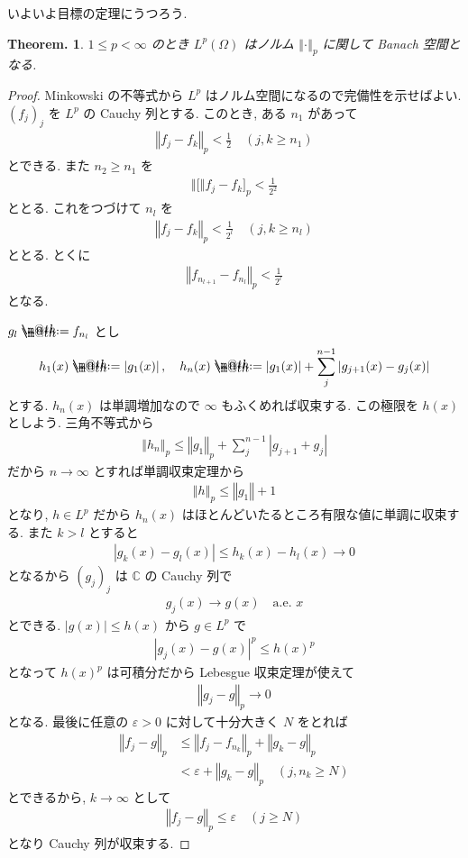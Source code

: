 \documentclass[openany, a4paper, oneside]{jsbook}
\makeatletter
\newcommand*{\defeq}{\mathrel{\rlap{%
\raisebox{0.3ex}{$\m@th\cdot$}}%
\raisebox{-0.3ex}{$\m@th\cdot$}}%
=}
\theoremstyle{break}
\newtheorem{thm}{Theorem.}[section]
\theoremstyle{breakdefn}
\newcommand{\abs}[1]{\left|#1\right|}
\newcommand{\norm}[1]{\left\Vert#1\right\Vert}
\newcommand{\pnorm}[1]{\left\Vert#1\right\Vert_p}
\newcommand{\bbC}{\mathbb{C}}
\makeatother
\begin{document}
いよいよ目標の定理にうつろう.
\begin{thm}
 $1 \le p < \infty$ のとき $L^p(\Omega)$ はノルム $\norm{\cdot}_p$ に関して Banach 空間となる.
\end{thm}
\begin{proof}
Minkowski の不等式から $L^p$ はノルム空間になるので完備性を示せばよい.
$(f_j)_j$ を $L^p$ の Cauchy 列とする.
このとき, ある $n_1$ があって
\begin{align}
 \norm{f_j - f_k}_p
 <
 \frac{1}{2} \quad (j, k \ge n_1)
\end{align}
とできる.
また $n_2 \ge n_1$ を
\begin{align}
 \norm[f_j - f_k]_p
 <
 \frac{1}{2^2}
\end{align}
ととる.
これをつづけて $n_l$ を
\begin{align}
 \norm{f_j - f_k}_p
 <
 \frac{1}{2^l} \quad (j, k \ge n_l)
\end{align}
ととる.
とくに
\begin{align}
 \norm{f_{n_{l + 1}} - f_{n_l}}_p
 <
 \frac{1}{2^l}
\end{align}
となる.

$g_l \defeq f_{n_l}$ とし
\begin{align}
 h_1(x)
 \defeq
 \abs{g_1 (x)}, \quad
 h_n(x)
 \defeq
 \abs{g_1(x)} + \sum_j^{n-1} \abs{g_{j+1}(x) - g_j(x)}
\end{align}
とする.
$h_n(x)$ は単調増加なので $\infty$ もふくめれば収束する.
この極限を $h(x)$ としよう.
三角不等式から
\begin{align}
 \norm{h_n}_p
 \leq
 \norm{g_1}_p + \sum_{j}^{n - 1} \abs{g_{j + 1} + g_j}
\end{align}
だから $n \to \infty$ とすれば単調収束定理から
\begin{align}
 \norm{h}_p
 \leq
 \norm{g_1} + 1
\end{align}
となり, $h \in L^p$ だから $h_n(x)$ はほとんどいたるところ有限な値に単調に収束する.
また $k > l$ とすると
\begin{align}
 \abs{g_k(x) - g_l(x)}
 \leq
 h_k(x) - h_l(x) \to 0
\end{align}
となるから $(g_j)_j$ は $\bbC$ の Cauchy 列で
\begin{align}
 g_j(x) \to g(x) \quad \text{a.e. } x
\end{align}
とできる.
$\abs{g(x)} \leq h(x)$ から $g \in L^p$ で
\begin{align}
 \abs{g_j(x) - g(x)}^p
 \leq
 h(x)^p
\end{align}
となって $h(x)^p$ は可積分だから Lebesgue 収束定理が使えて
\begin{align}
 \pnorm{g_j - g} \to 0
\end{align}
となる.
最後に任意の $\varepsilon > 0$ に対して十分大きく $N$ をとれば
\begin{align}
 \pnorm{f_j - g}
 &\leq
 \pnorm{f_j - f_{n_k}} + \pnorm{g_k - g} \\
 &<
 \varepsilon + \pnorm{g_k - g} \quad (j, n_k \geq N)
\end{align}
とできるから, $k \to \infty$ として
\begin{align}
 \pnorm{f_j - g}
 \leq
 \varepsilon \quad (j \geq N)
\end{align}
となり Cauchy 列が収束する.
\end{proof}
\end{document}
